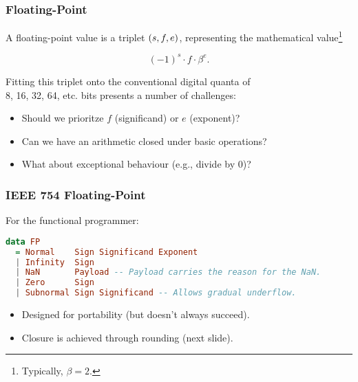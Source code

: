 \begin{frame}

\frametitle{Floating-Point}

\begin{center}

A floating-point value is a triplet ${ \mathopen{} \left( {s,f,e} \right) \mathclose{} }$, representing the mathematical
value\footnote{Typically, $\beta = 2$.}

$$(-1)^s \cdot f \cdot \beta^e.$$

\end{center}

\vspace{\fill}

Fitting this triplet onto the conventional digital quanta of \\ 8, 16, 32, 64,
etc. bits presents a number of challenges:

\begin{itemize}

\item Should we prioritze $f$ (significand) or $e$ (exponent)?

\item Can we have an arithmetic closed under basic operations?

\item What about exceptional behaviour (e.g., divide by $0$)?

\end{itemize}

\end{frame}


\begin{frame}[fragile]

\frametitle{IEEE 754 Floating-Point}

For the functional programmer:

\begin{lstlisting}[language=haskell,numbers=none]
data FP
  = Normal    Sign Significand Exponent
  | Infinity  Sign
  | NaN       Payload -- Payload carries the reason for the NaN.
  | Zero      Sign
  | Subnormal Sign Significand -- Allows gradual underflow.
\end{lstlisting}

\vspace{\fill}

\begin{itemize}

\item Designed for portability (but doesn't always succeed).

\item Closure is achieved through rounding (next slide).

\end{itemize}

\end{frame}


